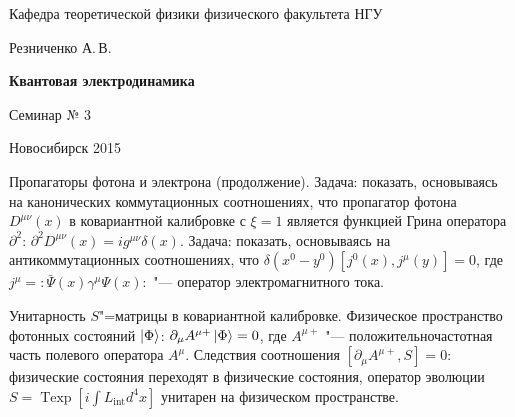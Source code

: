 \documentclass[12pt,pagesize,paper=landscape,paper=192mm:108mm]{scrbook}
\DeclareMathOperator{\Texp}{Texp}
\begin{document}
\begin{titlepage}
\begin{center}
    Кафедра теоретической физики физического факультета НГУ
    \medskip

    \Large
    Резниченко А.\,В.
    \bigskip

    \huge
    \textbf{Квантовая электродинамика}
    \bigskip

    \Large
    Семинар № 3
    \vfill

    \normalsize
    \vfill

    \normalsize \ccbysa\hspace{0.5em}  Новосибирск 2015
  \end{center}
\end{titlepage}
\newpage

\vspace*{-1em}
\begin{center}
\vfill
  \begin{minipage}{0.7\linewidth}

    Пропагаторы фотона и электрона (продолжение).  Задача: показать,
    основываясь на канонических коммутационных соотношениях, что
    пропагатор фотона $D^{\mu\nu}(x)$ в ковариантной калибровке с
    $\xi=1$ является функцией Грина оператора $\partial^2$:
    $\partial^2 D^{\mu\nu}(x)=i g^{\mu\nu}\delta(x)$.  Задача:
    показать, основываясь на антикоммутационных соотношениях, что
    $\delta(x^0-y^0)[j^0(x),j^{\mu}(y)]=0$, где
    $j^{\mu}={:}\bar{\Psi}(x) \gamma^{\mu} \Psi(x){:}$ "--- оператор
    электромагнитного тока.
    \smallskip

    Унитарность $S$"=матрицы в ковариантной калибровке.  Физическое
    пространство фотонных состояний $\ket{\Phi}$:
    $\partial_{\mu}A^{\mu+}\ket{\Phi}=0$, где $A^{\mu+}$ "---
    положительночастотная часть полевого оператора
    $A^{\mu}$. Следствия соотношения $[\partial_{\mu}A^{\mu+}, S]=0$:
    физические состояния переходят в физические состояния, оператор
    эволюции $S=\Texp[i \int L_{\text{int}} d^4 x]$ унитарен на
    физическом пространстве.
  \end{minipage}
  \vfill

\end{center}
\end{document}
